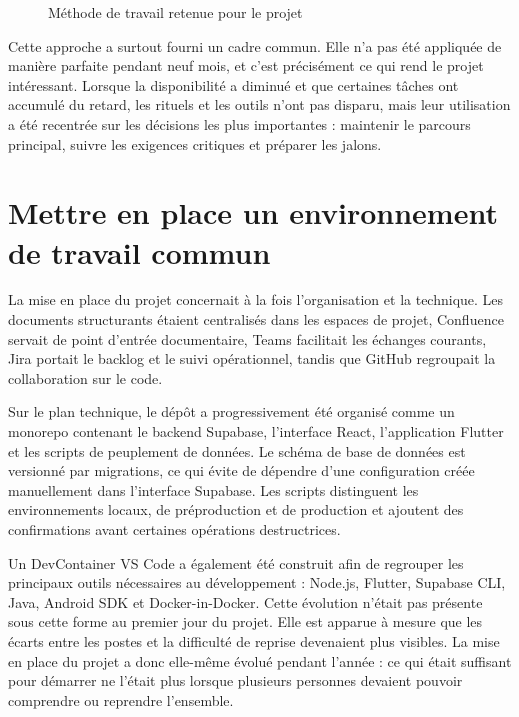 \begin{figure}[H]
\centering
{}
\caption{Méthode de travail retenue pour le projet}
\label{fig:lynx-methode}
\end{figure}

Cette approche a surtout fourni un cadre commun. Elle n'a pas été appliquée de manière parfaite pendant neuf mois, et c'est précisément ce qui rend le projet intéressant. Lorsque la disponibilité a diminué et que certaines tâches ont accumulé du retard, les rituels et les outils n'ont pas disparu, mais leur utilisation a été recentrée sur les décisions les plus importantes : maintenir le parcours principal, suivre les exigences critiques et préparer les jalons.

\section{Mettre en place un environnement de travail commun}

La mise en place du projet concernait à la fois l'organisation et la technique. Les documents structurants étaient centralisés dans les espaces de projet, Confluence servait de point d'entrée documentaire, Teams facilitait les échanges courants, Jira portait le backlog et le suivi opérationnel, tandis que GitHub regroupait la collaboration sur le code.

Sur le plan technique, le dépôt a progressivement été organisé comme un monorepo contenant le backend Supabase, l'interface React, l'application Flutter et les scripts de peuplement de données. Le schéma de base de données est versionné par migrations, ce qui évite de dépendre d'une configuration créée manuellement dans l'interface Supabase. Les scripts distinguent les environnements locaux, de préproduction et de production et ajoutent des confirmations avant certaines opérations destructrices.

Un DevContainer VS Code a également été construit afin de regrouper les principaux outils nécessaires au développement : Node.js, Flutter, Supabase CLI, Java, Android SDK et Docker-in-Docker. Cette évolution n'était pas présente sous cette forme au premier jour du projet. Elle est apparue à mesure que les écarts entre les postes et la difficulté de reprise devenaient plus visibles. La mise en place du projet a donc elle-même évolué pendant l'année : ce qui était suffisant pour démarrer ne l'était plus lorsque plusieurs personnes devaient pouvoir comprendre ou reprendre l'ensemble.

